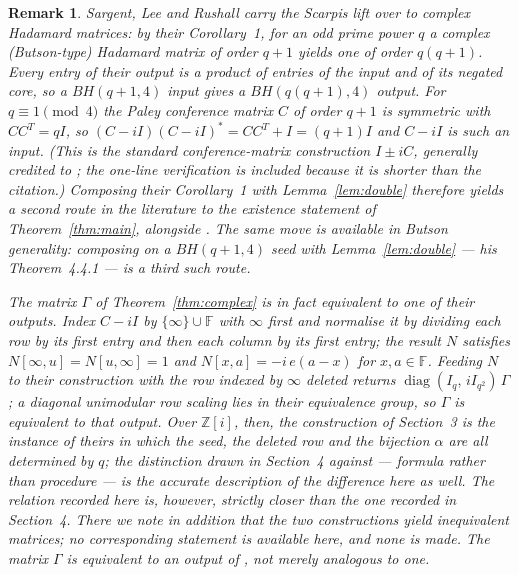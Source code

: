 \documentclass[11pt]{article}
\newtheorem{remark}{Remark}
\newcommand{\F}{\mathbb F}
\newcommand{\Z}{\mathbb Z}
\begin{document}
\begin{remark}\label{rem:slr}
Sargent, Lee and Rushall \cite{SargentLeeRushall2024} carry the Scarpis lift
over to complex Hadamard matrices: by their Corollary~1, for an odd prime
power \(q\) a complex (Butson-type) Hadamard matrix of order \(q+1\) yields
one of order \(q(q+1)\).  Every entry of their output is a product of
entries of the input and of its negated core, so a \(BH(q+1,4)\) input
gives a \(BH(q(q+1),4)\) output.  For \(q\equiv1\pmod4\) the Paley
conference matrix \(C\) of order \(q+1\) is symmetric with \(CC^{T}=qI\), so
\((C-iI)(C-iI)^{*}=CC^{T}+I=(q+1)I\) and \(C-iI\) is such an input.  (This
is the standard conference-matrix construction \(I\pm iC\), generally
credited to \cite{Turyn1970}; the one-line verification is included because
it is shorter than the citation.)
Composing their Corollary~1 with Lemma~\ref{lem:double} therefore yields a
second route in the literature to the existence statement of
Theorem~\ref{thm:main}, alongside \cite{FaroukWang2020}.  The same move is
available in Butson generality: composing \cite[Thm.~4.3.3]{Ponasso2024} on a
\(BH(q+1,4)\) seed with Lemma~\ref{lem:double} --- his Theorem~4.4.1 --- is a
third such route.

The matrix \(\Gamma\) of Theorem~\ref{thm:complex} is in fact equivalent to
one of their outputs.  Index \(C-iI\) by \(\{\infty\}\cup\F\) with \(\infty\) first and
normalise it by dividing each row by its first entry and then each column by
its first entry; the result \(N\) satisfies \(N[\infty,u]=N[u,\infty]=1\)
and \(N[x,a]=-i\,e(a-x)\) for \(x,a\in\F\).  Feeding \(N\) to their
construction with the row indexed by \(\infty\) deleted returns
\(\operatorname{diag}(I_q,\,iI_{q^{2}})\,\Gamma\); a diagonal unimodular row
scaling lies in their equivalence group, so \(\Gamma\) is equivalent to that
output.  Over \(\Z[i]\), then, the construction of Section~3 is the instance of
theirs in which the seed, the deleted row and the bijection \(\alpha\) are
all determined by \(q\); the distinction drawn in Section~4 against
\cite{FaroukWang2020} --- formula rather than procedure --- is the accurate
description of the difference here as well.  The relation recorded here is,
however, strictly closer than the one recorded in Section~4.  There we note in
addition that the two constructions yield inequivalent matrices; no
corresponding statement is available here, and none is made.  The matrix
\(\Gamma\) is equivalent to an output of \cite{SargentLeeRushall2024}, not
merely analogous to one.
\end{remark}
\end{document}
